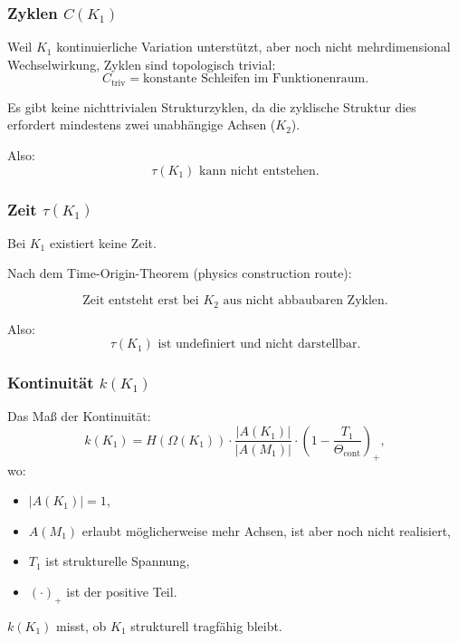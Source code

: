 \subsubsection{Zyklen \texorpdfstring{$C(K_1)$}{C(K_1)}}

Weil $K_1$ kontinuierliche Variation unterstützt, aber noch nicht mehrdimensional
Wechselwirkung, Zyklen sind topologisch trivial:
\[
C_{\mathrm{triv}} = \text{konstante Schleifen im Funktionenraum}.
\]

Es gibt keine nichttrivialen Strukturzyklen, da die zyklische Struktur dies erfordert
mindestens zwei unabhängige Achsen ($K_2$).

Also:
\[
\tau(K_1) \text{ kann nicht entstehen.}
\]

\subsubsection{Zeit \texorpdfstring{$\tau(K_1)$}{\tau(K_1)}}

Bei $K_1$ existiert keine Zeit.

Nach dem Time-Origin-Theorem (physics construction route):

\[
\text{Zeit entsteht erst bei } K_2 \text{ aus nicht abbaubaren Zyklen}.
\]

Also:
\[
\tau(K_1) \text{ ist undefiniert und nicht darstellbar.}
\]

\subsubsection{Kontinuität \texorpdfstring{$k(K_1)$}{k(K_1)}}

Das Maß der Kontinuität:
\[
k(K_1) =
H(\Omega(K_1)) \cdot
\frac{|A(K_1)|}{|A(M_1)|} \cdot
(1 - \frac{T_1}{\Theta_{\mathrm{cont}}})_+,
\]
wo:
\begin{itemize}
    \item $|A(K_1)| = 1$,
    \item $A(M_1)$ erlaubt möglicherweise mehr Achsen, ist aber noch nicht realisiert,
    \item $T_1$ ist strukturelle Spannung,
    \item $(\cdot)_+$ ist der positive Teil.
\end{itemize}

$k(K_1)$ misst, ob $K_1$ strukturell tragfähig bleibt.

